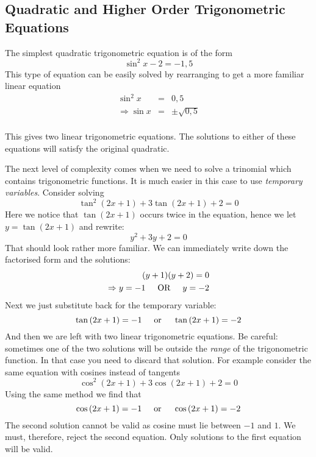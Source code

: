 \subsection{Quadratic and Higher Order Trigonometric Equations}
The simplest quadratic trigonometric equation is of the form
\[ \sin^2x-2=-1,5 \]
This type of equation can be easily solved by rearranging to get a more familiar linear equation
\begin{eqnarray*}
\sin^2x&=&0,5 \\
\Rightarrow \sin x&=&\pm\sqrt{0,5} \\
\end{eqnarray*}

This gives two linear trigonometric equations. The solutions to either of these equations will satisfy the original quadratic. 

The next level of complexity comes when we need to solve a trinomial which contains trigonometric functions. It is much easier in this case to use \emph{temporary variables}.
Consider solving
\[ \tan^2{(2x + 1)} + 3\tan{(2x + 1)} + 2 = 0 \]
Here we notice that $\tan(2x + 1)$ occurs twice in the equation, hence we let $y = \tan(2x + 1)$ and rewrite:
\[ y^2 + 3y + 2 = 0 \]
That should look rather more familiar. We can immediately write down the factorised form and the solutions:
\begin{eqnarray*}
(y + 1)(y + 2) = 0 \\
\Rightarrow y = -1 \hspace{0.5cm} \mbox{OR} \hspace{0.5cm} y = -2 \\
\end{eqnarray*}
Next we just substitute back for the temporary variable:
\[ \tan{(2x + 1)} = -1 \hspace{0.5cm} \mbox{or} \hspace{0.5cm} \tan{(2x + 1)} = -2 \]
And then we are left with two linear trigonometric equations. Be careful: sometimes one of the two solutions will be outside the \emph{range} of the trigonometric function. In that case you need to discard that solution. For example consider the same equation with cosines instead of tangents
\[ \cos^2{(2x + 1)} + 3\cos{(2x + 1)} + 2 = 0 \]
Using the same method we find that
\[ \cos{(2x + 1)} = -1 \hspace{0.5cm} \mbox{or} \hspace{0.5cm} \cos{(2x + 1)} = -2 \]
The second solution cannot be valid as cosine must lie between $-1$ and $1$. We must, therefore, reject the second equation. Only solutions to the first equation will be valid. 


